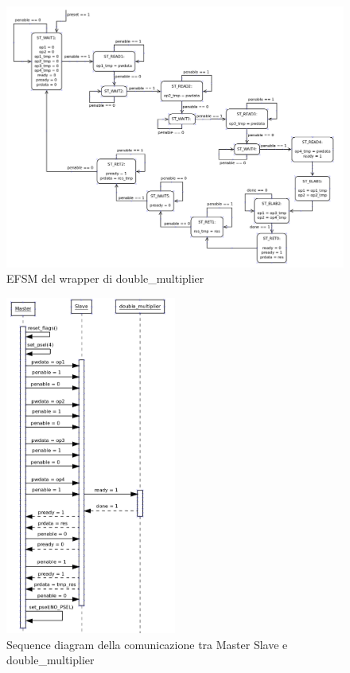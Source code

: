 \documentclass[]{IEEEtran}
\begin{document}
\nocite{*}


\appendix


\begin{figure}[bt]
    \centering
    \includegraphics[width=\textwidth]{figures/EFSM_wrapper.png}
    \caption{EFSM del wrapper di double\_multiplier}
    \label{fig:EFSM_WRAPPER}
\end{figure}

\begin{figure}[bt]
    \centering
    \includegraphics[width=0.5\textwidth]{figures/seq_diagram.png}
    \caption{Sequence diagram della comunicazione tra Master Slave e double\_multiplier}
    \label{fig:SEQ_DIAGRAM}
\end{figure}
\end{document}
